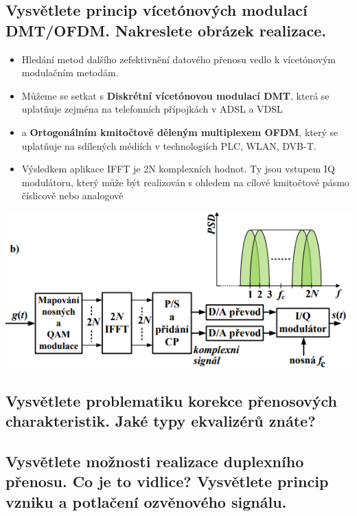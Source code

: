\subsection{Vysvětlete princip vícetónových modulací DMT/OFDM. Nakreslete obrázek realizace.}
\begin{itemize}
    \item Hledání metod dalšího zefektivnění datového přenosu vedlo k vícetónovým modulačním metodám.
    \item Můžeme se setkat s \textbf{Diskrétní vícetónovou modulací DMT}, která se uplatňuje zejména na telefonních přípojkách v ADSL a VDSL  
    \item a \textbf{Ortogonálním kmitočtově děleným multiplexem OFDM}, který se uplatňuje na sdílených médiích v technologiích PLC, WLAN, DVB-T. 
    \item Výsledkem aplikace IFFT je 2N komplexních hodnot. Ty jsou vstupem IQ modulátoru, který může být realizován s ohledem na cílové kmitočtové pásmo číslicově nebo analogově
\end{itemize}
\includegraphics[]{images/image.png}
    
\subsection{Vysvětlete problematiku korekce přenosových charakteristik. Jaké typy ekvalizérů znáte?}

\subsection{Vysvětlete možnosti realizace duplexního přenosu. Co je to vidlice? Vysvětlete princip
vzniku a potlačení ozvěnového signálu.}
